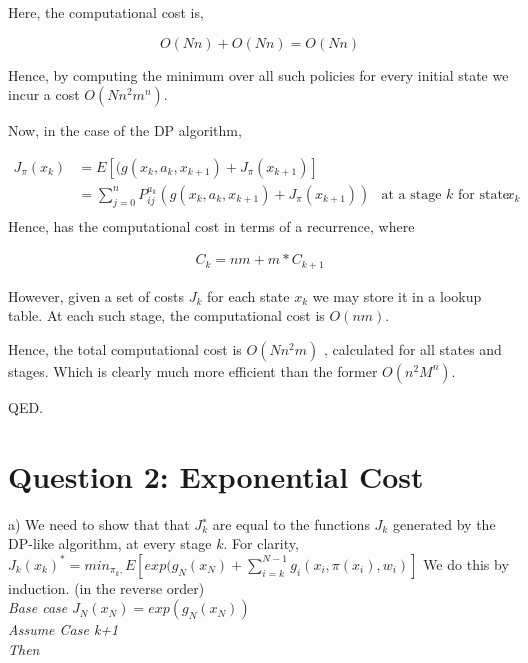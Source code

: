 \documentclass[12pt]{article}
\begin{document}
Here, the computational cost is,

$$ O(Nn) +O(Nn) = O(Nn) $$

Hence, by computing the minimum over all such policies for every initial state we incur a cost $ O(Nn^2m^n) $.


Now, in the case of the DP algorithm, 

\begin{align*}
 J_{\pi}(x_k) & =  E[(g(x_k,a_k,x_{k+1}) + J_{\pi}(x_{k+1})]  \\
 & = \sum_{j=0}^{n}P_{ij}^{a_k} (g(x_k,a_k,x_{k+1}) + J_{\pi}(x_{k+1})) & \text{at a stage $k$ for state }x_k\\
\end{align*}
Hence, has the computational cost in terms of a recurrence, where

\begin{align*}
C_k=nm+m*C_{k+1}
\end{align*}

However, given a set of costs $J_k$ for each state $x_k$ we may store it in a lookup table. At each such stage, the computational cost is $O(nm)$.

Hence, the total computational cost is $O(Nn^2m)$ , calculated for all states and stages. Which is clearly much more efficient than the former $O(n^2M^n)$.

QED.

\section{Question 2: Exponential Cost}

a) We need to show that  that $J_k^∗$ are equal to the functions $J_k$ generated by the DP-like algorithm, at every stage $k$. 
For clarity,
 $ J_k(x_k)^*=min_{\pi_k, } E [ exp( g_N(x_N ) + \sum_{i=k}^{N-1}g_i(x_i,\pi(x_i),w_i)]$  
We do this by induction. (in the reverse order) \\

\textit{Base case} $J_N(x_N)=exp(g_N(x_N)) $  \\

\textit{Assume Case k+1} \\
\textit{Then} \\
\end{document}
